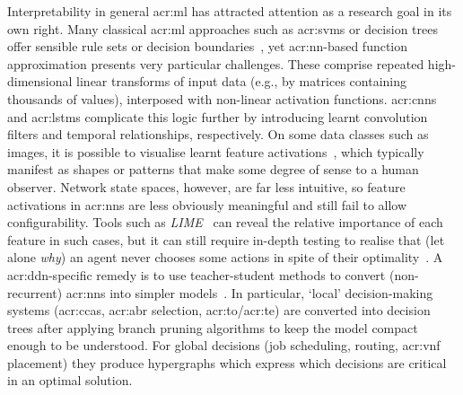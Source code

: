 Interpretability in general \gls{acr:ml} has attracted attention as a research goal in its own right.
Many classical \gls{acr:ml} approaches such as \glspl{acr:svm} or decision trees offer sensible rule sets or decision boundaries~\parencite{DBLP:conf/pkdd/MolnarCB20,interpretable-ml}, yet \gls{acr:nn}-based function approximation presents very particular challenges.
These comprise repeated high-dimensional linear transforms of input data (e.g., by matrices containing thousands of values), interposed with non-linear activation functions.
\glspl{acr:cnn} and \glspl{acr:lstm} complicate this logic further by introducing learnt convolution filters and temporal relationships, respectively.
On some data classes such as images, it is possible to visualise learnt feature activations~\parencite{cnn-features-distil}, which typically manifest as shapes or patterns that make some degree of sense to a human observer.
Network state spaces, however, are far less intuitive, so feature activations in \glspl{acr:nn} are less obviously meaningful and still fail to allow configurability.
Tools such as \emph{LIME}~\parencite{DBLP:conf/kdd/Ribeiro0G16} can reveal the relative importance of each feature in such cases, but it can still require in-depth testing to realise that (let alone \emph{why}) an agent never chooses some actions in spite of their optimality~\parencite{DBLP:conf/sigcomm/DethiseCK19}.
A \gls{acr:ddn}-specific remedy is to use teacher-student methods to convert (non-recurrent) \glspl{acr:nn} into simpler models~\parencite{DBLP:conf/sigcomm/MengWBXMH20}.
In particular, `local' decision-making systems (\glspl{acr:cca}, \gls{acr:abr} selection, \gls{acr:to}/\gls{acr:te}) are converted into decision trees after applying branch pruning algorithms to keep the model compact enough to be understood.
For global decisions (job scheduling, routing, \gls{acr:vnf} placement) they produce hypergraphs which express which decisions are critical in an optimal solution.
